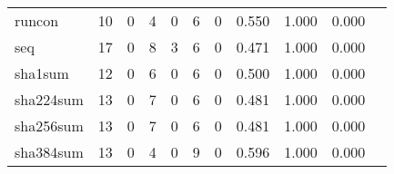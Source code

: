 \begin{longtable}{lp{1.20cm}p{1.20cm}p{1.20cm}p{1.20cm}p{1.20cm}p{1.20cm}p{1.20cm}p{1.20cm}p{1.20cm}p{1.20cm}}
runcon    &                                    10 &                                                  0 &                                                  4 &                                                  0 &                                                  6 &                                                  0 &                                         0.550 &                                              1.000 &                                              0.000 \\
seq       &                                    17 &                                                  0 &                                                  8 &                                                  3 &                                                  6 &                                                  0 &                                         0.471 &                                              1.000 &                                              0.000 \\
sha1sum   &                                    12 &                                                  0 &                                                  6 &                                                  0 &                                                  6 &                                                  0 &                                         0.500 &                                              1.000 &                                              0.000 \\
sha224sum &                                    13 &                                                  0 &                                                  7 &                                                  0 &                                                  6 &                                                  0 &                                         0.481 &                                              1.000 &                                              0.000 \\
sha256sum &                                    13 &                                                  0 &                                                  7 &                                                  0 &                                                  6 &                                                  0 &                                         0.481 &                                              1.000 &                                              0.000 \\
sha384sum &                                    13 &                                                  0 &                                                  4 &                                                  0 &                                                  9 &                                                  0 &                                         0.596 &                                              1.000 &                                              0.000 \\

\end{longtable}
